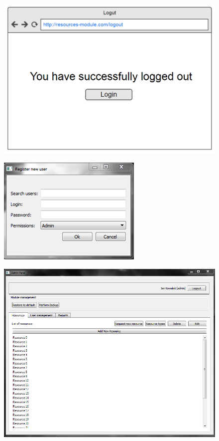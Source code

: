 \documentclass[11pt, a4paper, oneside]{report}
\begin{document}
\begin{figure}[H]
\centering
\includegraphics[scale=0.5]{logout_panel.png}
\end{figure}

\begin{figure}[H]
\centering
\includegraphics[scale=0.8]{register_user_panel.png}
\end{figure}

\begin{figure}[H]
\centering
\includegraphics[scale=0.45]{admin_panel.png}
\end{figure}
\end{document}
